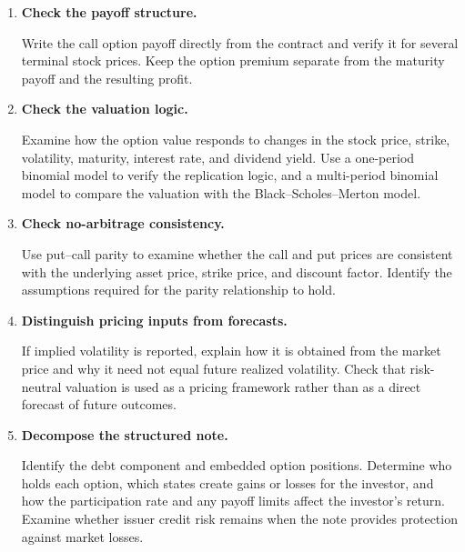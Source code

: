 \begin{enumerate}

\item \textbf{Check the payoff structure.}

Write the call option payoff directly from the contract
and verify it for several terminal stock prices. Keep
the option premium separate from the maturity payoff
and the resulting profit.

\item \textbf{Check the valuation logic.}

Examine how the option value responds to changes in the
stock price, strike, volatility, maturity, interest rate,
and dividend yield. Use a one-period binomial model to
verify the replication logic, and a multi-period binomial
model to compare the valuation with the
Black--Scholes--Merton model.

\item \textbf{Check no-arbitrage consistency.}

Use put--call parity to examine whether the call and put
prices are consistent with the underlying asset price,
strike price, and discount factor. Identify the assumptions
required for the parity relationship to hold.

\item \textbf{Distinguish pricing inputs from forecasts.}

If implied volatility is reported, explain how it is
obtained from the market price and why it need not equal
future realized volatility. Check that risk-neutral
valuation is used as a pricing framework rather than
as a direct forecast of future outcomes.

\item \textbf{Decompose the structured note.}

Identify the debt component and embedded option positions.
Determine who holds each option, which states create
gains or losses for the investor, and how the participation
rate and any payoff limits affect the investor's return.
Examine whether issuer credit risk remains when the note
provides protection against market losses.

\end{enumerate}




